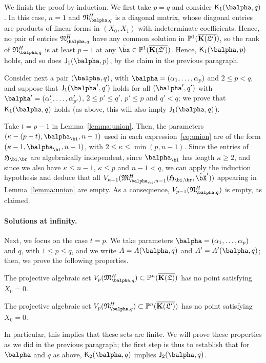 \documentclass[12pt]{article}
\begin{document}
We finish the proof by induction. We first take $p=q$ and consider
$\assJ_1(\balpha,q)$.  In this case, $n=1$ and
$\mathfrak{N}^H_{\balpha,q}$ is a diagonal matrix, whose diagonal
entries are products of linear forms in $(X_0,X_1)$ with indeterminate
coefficients. Hence, no pair of entries $\mathfrak{N}^H_{\balpha,q}$
have any common solution in $\mathbb{P}^1(\overline{\mathbf{K}(\mathfrak{L}')})$, so the rank of
$\mathfrak{N}^H_{\balpha,q}$ is at least $p-1$ at any $\tilde\bx \in
\P^1(\KKGpbar)$. Hence, $\assJ_1(\balpha,p)$ holds, and so does
$\assI_1(\balpha,p)$, by the claim in the previous paragraph.

Consider next a pair $(\balpha,q)$, with
$\balpha=(\alpha_1,\dots,\alpha_p)$ and $2 \le p < q$, and suppose
that $\assI_1(\balpha',q')$ holds for all $(\balpha',q')$ with
$\balpha'=(\alpha'_1,\dots,\alpha'_{p'})$, $2 \le p' \le q'$, $p' \le p$ and $q'
< q$; we prove that $\assJ_1(\balpha,q)$ holds (as above, this will
also imply $\assI_1(\balpha,q)$).

Take $t=p-1$ in Lemma~\ref{lemma:union}. Then, the parameters
$(\kappa-(p-t),\balpha_\bi,n-1)$ used in each
expression~\eqref{eq:union} are of the form
$(\kappa-1,\balpha_\bi,n-1)$, with $2 \le \kappa \le \min(p,n-1)$.
Since the entries of $\mathfrak{H}_{\bi,\br}$ are algebraically
independent, since $\balpha_\bi$ has length $\kappa\ge 2$, and since we also
have $\kappa \le n-1$, $\kappa \le p$ and $n-1 < q$, we can apply the
induction hypothesis and deduce that all
$V_{\kappa-1}(\mathfrak{M}^H_{\balpha_\bi,n-1}(\mathfrak{H}_{\bi,\br},\tilde\bX'))$ appearing
in Lemma~\ref{lemma:union} are empty. As a consequence,
$V_{p-1}(\mathfrak{N}^H_{\balpha,q})$ is empty, as claimed.


\paragraph{Solutions at infinity.} Next, we focus on the case $t=p$.
We take parameters $\balpha=(\alpha_1,\dots,\alpha_p)$ and $q$, with
$1 \le p \le q$, and we write $A=A(\balpha,q)$ and $A'=A'(\balpha,q)$;
then, we prove the following properties.
\begin{description}[leftmargin=*]
\item[$\assI_2(\balpha,q).$] The projective algebraic set
  $V_p(\mathfrak{M}^H_{\balpha,q}) \subset \P^n(\KKGbar)$ has no point
  satisfying $X_0=0$.
\item[$\assJ_2(\balpha,q).$] The projective algebraic set
  $V_p(\mathfrak{N}^H_{\balpha,q}) \subset \P^n(\KKGpbar)$ has no point
  satisfying $X_0=0$.
\end{description}
In particular, this implies that these sets are finite. We will prove
these properties as we did in the previous paragraph; the first step
is thus to establish that for $\balpha$ and $q$ as above,
$\assJ_2(\balpha,q)$ implies $\assI_2(\balpha,q)$.
\end{document}
